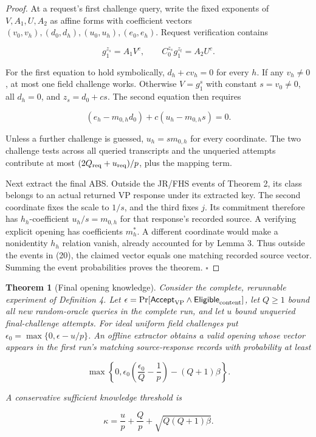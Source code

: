 \documentclass[11pt]{article}
\newtheorem{theorem}{Theorem}
\begin{document}
\begin{proof}
At a request's first challenge query, write the fixed exponents of \(V,A_1,U,A_2\) as affine forms with coefficient vectors \((v_0,v_h),(d_0,d_h),(u_0,u_h),(e_0,e_h)\). Request verification contains

\[
g_1^{z_s}=A_1V^c,\qquad
C_0^{z_s}g_1^{z_t}=A_2U^c.
\tag{21}
\]

For the first equation to hold symbolically, \(d_h+cv_h=0\) for every \(h\). If any \(v_h\ne0\), at most one field challenge works. Otherwise \(V=g_1^s\) with constant \(s=v_0\ne0\), all \(d_h=0\), and \(z_s=d_0+cs\). The second equation then requires

\[
(e_h-m_{0,h}d_0)+c(u_h-m_{0,h}s)=0.
\tag{22}
\]

Unless a further challenge is guessed, \(u_h=sm_{0,h}\) for every coordinate. The two challenge tests across all queried transcripts and the unqueried attempts contribute at most \((2Q_{\rm req}+u_{\rm req})/p\), plus the mapping term.

Next extract the final ABS. Outside the JR/FHS events of Theorem 2, its class belongs to an actual returned VP response under its extracted key. The second coordinate fixes the scale to \(1/s\), and the third fixes \(j\). Its commitment therefore has \(h_h\)-coefficient \(u_h/s=m_{0,h}\) for that response's recorded source. A verifying explicit opening has coefficients \(m_h^*\). A different coordinate would make a nonidentity \(h_h\) relation vanish, already accounted for by Lemma 3. Thus outside the events in (20), the claimed vector equals one matching recorded source vector. Summing the event probabilities proves the theorem. \(\square\)

\end{proof}
\begin{theorem}[Final opening knowledge]
Consider the complete, rerunnable experiment of Definition 4. Let \(\epsilon=\Pr[\mathsf{Accept}_{\rm VP}\land\mathsf{Eligible}_{\rm content}]\), let \(Q\ge1\) bound all new random-oracle queries in the complete run, and let \(u\) bound unqueried final-challenge attempts. For ideal uniform field challenges put \(\epsilon_0=\max\{0,\epsilon-u/p\}\). An offline extractor obtains a valid opening whose vector appears in the first run's matching source-response records with probability at least

\[
\max\left\{0,\epsilon_0\left(\frac{\epsilon_0}{Q}-\frac1p\right)
-(Q+1)\beta\right\}.
\tag{23}
\]

A conservative sufficient knowledge threshold is

\[
\kappa=\frac up+\frac Qp+\sqrt{Q(Q+1)\beta}.
\tag{24}
\]

\end{theorem}
\end{document}
